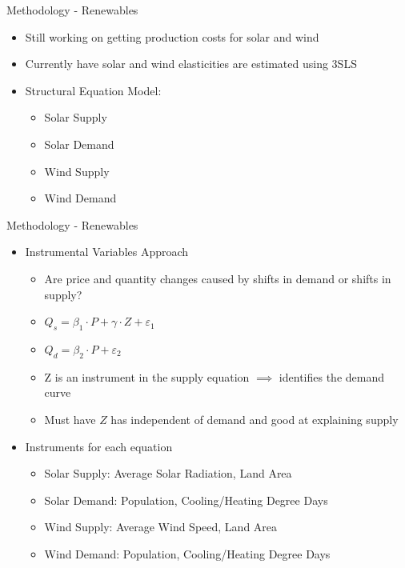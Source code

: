 \documentclass[11pt,aspectratio=169]{beamer}
\begin{document}
\begin{frame}{Methodology - Renewables}

	\begin{itemize}
		\setlength\itemsep{1.5em}
		\item Still working on getting production costs for solar and wind
		
		\item Currently have solar and wind elasticities are estimated using 3SLS 
		
		\item Structural Equation Model:
	
		\begin{itemize}
			\item Solar Supply%
			\item Solar Demand%
			\item Wind Supply%
			\item Wind Demand%
		\end{itemize}
		
	\end{itemize}

\end{frame}


\begin{frame}{Methodology - Renewables}

\begin{itemize}
	\item Instrumental Variables Approach
	
	\begin{itemize}
		\item Are price and quantity changes caused by shifts in demand or shifts in supply?
		\item $Q_s = \beta_1 \cdot P + \gamma \cdot Z + \varepsilon_1$
		\item $Q_d = \beta_2 \cdot P + \varepsilon_2$
		\item Z is an instrument in the supply equation $\implies$ identifies the demand curve
		\item Must have $Z$ has independent of demand and good at explaining supply
	\end{itemize}

	\item Instruments for each equation
	
	\begin{itemize}
		\item Solar Supply: Average Solar Radiation, Land Area
		\item Solar Demand: Population, Cooling/Heating Degree Days
		\item Wind Supply: Average Wind Speed, Land Area
		\item Wind Demand: Population, Cooling/Heating Degree Days
	\end{itemize}
	
\end{itemize}

\end{frame}
\end{document}
